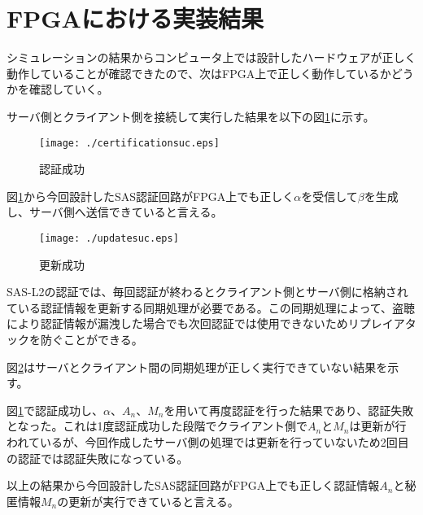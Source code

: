 \documentclass{thesis}
\begin{document}
\section{FPGAにおける実装結果}
シミュレーションの結果からコンピュータ上では設計したハードウェアが正しく動作していることが確認できたので、次はFPGA上で正しく動作しているかどうかを確認していく。\par
サーバ側とクライアント側を接続して実行した結果を以下の図\ref{認証成功}に示す。
\begin{figure}[H]
 \center
 \texttt{[image: ./certificationsuc.eps]}
 \caption{認証成功}
 \label{認証成功}
 \end{figure}
 図\ref{認証成功}から今回設計したSAS認証回路がFPGA上でも正しく$\alpha$を受信して$\beta$を生成し、サーバ側へ送信できていると言える。
 \begin{figure}[H]
 \center
 \texttt{[image: ./updatesuc.eps]}
 \caption{更新成功}
 \label{更新成功}
 \end{figure}
 SAS-L2の認証では、毎回認証が終わるとクライアント側とサーバ側に格納されている認証情報を更新する同期処理が必要である。この同期処理によって、盗聴により認証情報が漏洩した場合でも次回認証では使用できないためリプレイアタックを防ぐことができる。\par
図\ref{更新成功}はサーバとクライアント間の同期処理が正しく実行できていない結果を示す。\par
図\ref{認証成功}で認証成功し、$\alpha$、$A_n$、$M_n$を用いて再度認証を行った結果であり、認証失敗となった。これは1度認証成功した段階でクライアント側で$A_n$と$M_n$は更新が行われているが、今回作成したサーバ側の処理では更新を行っていないため2回目の認証では認証失敗になっている。\par
以上の結果から今回設計したSAS認証回路がFPGA上でも正しく認証情報$A_n$と秘匿情報$M_n$の更新が実行できていると言える。
\end{document}
